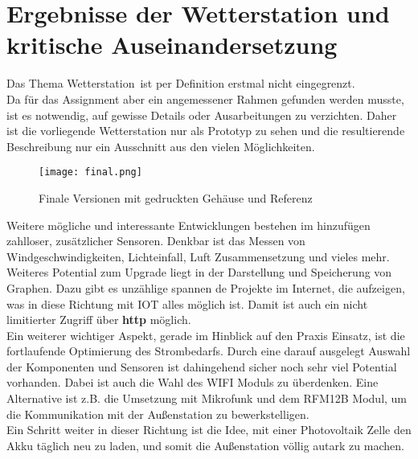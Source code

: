 \documentclass[12pt,a4paper]{scrartcl}	%
\begin{document}
\section{Ergebnisse der Wetterstation und kritische Auseinandersetzung} 
Das Thema \glqq Wetterstation\grqq~ist per Definition erstmal nicht eingegrenzt.\\
Da für das Assignment aber ein angemessener Rahmen gefunden werden musste, ist es notwendig, auf gewisse Details oder Ausarbeitungen zu verzichten. Daher ist die vorliegende Wetterstation nur als Prototyp zu sehen und die resultierende Beschreibung nur ein Ausschnitt aus den vielen Möglichkeiten.
\begin{figure}[htb]
	\centering
	\texttt{[image: final.png]}
	\caption{Finale Versionen mit gedruckten Gehäuse und Referenz}
\end{figure}
Weitere mögliche und interessante Entwicklungen bestehen im hinzufügen zahlloser, zusätzlicher Sensoren. Denkbar ist das Messen von Windgeschwindigkeiten, Lichteinfall, Luft Zusammensetzung und vieles mehr.\\
Weiteres Potential zum Upgrade liegt in der Darstellung und Speicherung von Graphen. Dazu gibt es unzählige spannen
de Projekte im Internet, die aufzeigen, was in diese Richtung mit IOT alles möglich ist. Damit ist auch ein nicht limitierter Zugriff über \textbf{http} möglich.\\
Ein weiterer wichtiger Aspekt, gerade im Hinblick auf den Praxis Einsatz, ist die fortlaufende Optimierung des Strombedarfs. Durch eine darauf ausgelegt Auswahl der Komponenten und Sensoren ist dahingehend sicher noch sehr viel Potential vorhanden. Dabei ist auch die Wahl des WIFI Moduls zu überdenken. Eine Alternative ist z.B. die Umsetzung mit Mikrofunk und dem RFM12B Modul, um die Kommunikation mit der Außenstation zu bewerkstelligen.\\
Ein Schritt weiter in dieser Richtung ist die Idee, mit einer Photovoltaik Zelle den Akku täglich neu zu laden, und somit die Außenstation völlig autark zu machen.\\
\end{document}
